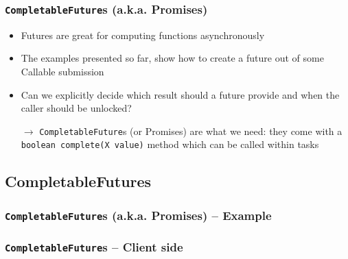 \documentclass{beamer}\mode<presentation>{\usetheme{AMSCesenaPurpleAndGold}}
\begin{document}
\begin{frame}[allowframebreaks]
\frametitle{\texttt{CompletableFuture}s (a.k.a. Promises)}

\begin{itemize}
\item Futures are great for computing functions \alert{asynchronously}

\vspace{.3cm}

\item The examples presented so far, show how to create a future out of some Callable submission

\vspace{.3cm}

\item Can we explicitly decide which result should a future provide and when the caller should be unlocked?

\vspace{.6cm}

\item[$\rightarrow$] \texttt{\alert{CompletableFuture}}s (or Promises) are what we need: they come with a \texttt{boolean complete(X value)} method which can be called within tasks
\end{itemize}

\framebreak



\end{frame}

\subsection{CompletableFutures}

\begin{frame}%
\frametitle{\texttt{CompletableFuture}s (a.k.a. Promises) -- Example}



\end{frame}

\begin{frame}%
\frametitle{\texttt{CompletableFuture}s -- Client side}



\end{frame}
\end{document}
